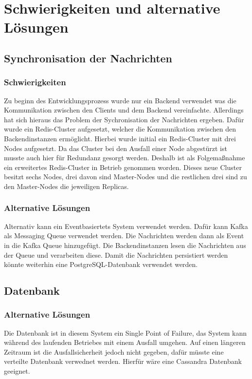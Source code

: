 \chapter{Schwierigkeiten und alternative Lösungen}

\section{Synchronisation der Nachrichten}
\subsection{Schwierigkeiten}
Zu beginn des Entwicklungsprozess wurde nur ein Backend verwendet was die Kommunikation zwischen den Clients und dem Backend vereinfachte.
Allerdings hat sich hieraus das Problem der Sychronisation der Nachrichten ergeben.
Dafür wurde ein Redis-Cluster aufgesetzt, welcher die Kommunikation zwischen den Backendinstanzen ermöglicht.
Hierbei wurde initial ein Redis-Cluster mit drei Nodes aufgesetzt.
Da das Cluster bei den Ausfall einer Node abgestürzt ist musste auch hier für Redundanz gesorgt werden.
Deshalb ist als Folgemaßnahme ein erweitertes Redis-Cluster in Betrieb genommen worden.
Dieses neue Cluster besitzt sechs Nodes, drei davon sind Master-Nodes und die restlichen drei sind zu den Master-Nodes die jeweiligen Replicas.

\subsection{Alternative Lösungen}
Alternativ kann ein Eventbasiertets System verwendet werden.
Dafür kann Kafka als Messaging Queue verwendet werden.
Die Nachrichten werden dann als Event in die Kafka Queue hinzugefügt.
Die Backendinstanzen lesen die Nachrichten aus der Queue und verarbeiten diese.
Damit die Nachrichten persistiert werden könnte weiterhin eine PostgreSQL-Datenbank verwendet werden.


\section{Datenbank}

\subsection{Alternative Lösungen}
Die Datenbank ist in diesem System ein Single Point of Failure, das System kann während des laufenden Betriebes mit einem Ausfall umgehen.
Auf einen längeren Zeitraum ist die Ausfallsicherheit jedoch nicht gegeben, dafür müsste eine verteilte Datenbank verwednet werden. 
Hierfür wäre eine Cassandra Datenbank geeignet.
